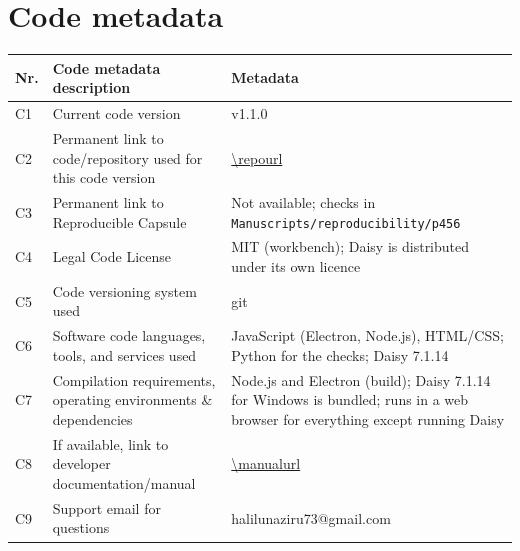 \documentclass[preprint,12pt]{elsarticle}
\begin{document}
\section*{Code metadata}
\begin{table}[H]\centering\small
\begin{tabularx}{\textwidth}{lp{5.2cm}X}
\toprule
Nr. & Code metadata description & Metadata\\\midrule
C1 & Current code version & v1.1.0\\
C2 & Permanent link to code/repository used for this code version & \url{\repourl}\\
C3 & Permanent link to Reproducible Capsule & Not available; checks in \texttt{Manuscripts/reproducibility/p456}\\
C4 & Legal Code License & MIT (workbench); Daisy is distributed under its own licence\\
C5 & Code versioning system used & git\\
C6 & Software code languages, tools, and services used & JavaScript (Electron, Node.js), HTML/CSS; Python for the checks; Daisy 7.1.14\\
C7 & Compilation requirements, operating environments \& dependencies & Node.js and Electron (build); Daisy 7.1.14 for Windows is bundled; runs in a web browser for everything except running Daisy\\
C8 & If available, link to developer documentation/manual & \url{\manualurl}\\
C9 & Support email for questions & halilunaziru73@gmail.com\\\bottomrule
\end{tabularx}
\end{table}
\end{document}
